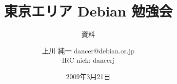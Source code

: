 




\documentclass[cjk,dvipdfmx,12pt]{beamer}
\usepackage{monthlypresentation}



\title{東京エリア Debian 勉強会}
\subtitle{資料}
\author{上川 純一 dancer@debian.or.jp\\IRC nick: dancerj}
\date{2009年3月21日}



